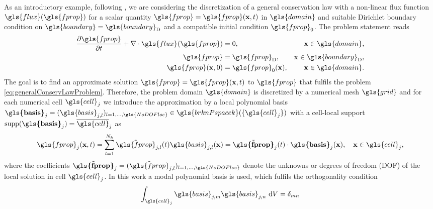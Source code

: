 As an introductory example, following \textcite{hesthaven_nodal_2008}, we are considering the discretization of a general conservation law with a non-linear flux function $\gls{flux}(\gls{fprop})$ for a scalar quantity $\gls{fprop} = \gls{fprop}(\vectr{x},t)$ in $\gls{domain}$ and suitable Dirichlet boundary condition on $\gls{boundary} = \diri{\gls{boundary}}$ and a compatible initial condition $\gls{fprop}_0$. The problem statement reads
\begin{subequations}
	\begin{align}
		\pDeriv{\gls{fprop}}{t} + \div{\gls{flux}(\gls{fprop})} & = 0,                        & \vectr{x} \in  \gls{domain},    \label{eq:generalConservLaw} \\
		\gls{fprop}                                             & = \diri{\gls{fprop}},       & \vectr{x} \in \diri{\gls{boundary}},
		\label{eq:generalConservLawBC}                                                                                                                       \\
		\gls{fprop}(\vectr{x}, 0)                               & = \gls{fprop}_0(\vectr{x}), & \vectr{x} \in  \gls{domain}.
		\label{eq:generalConservLawIC}
	\end{align}
	\label{eq:generalConservLawProblem}
\end{subequations}
The goal is to find an approximate solution $\gls{fprop} = \gls{fprop}(\vectr{x},t)$ to $\gls{fprop}$ that fulfils the problem \eqref{eq:generalConservLawProblem}. Therefore, the problem domain $\gls{domain}$ is discretized by a numerical mesh $\gls{grid}$ and for each numerical cell $\gls{cell}_j$ we introduce the approximation by a local polynomial basis $\vectr{\gls{basis}}_j = (\gls{basis}_{j,l})_{l=1,...,\gls{NoDOFloc}} \in \gls{brknPspacek}(\{\gls{cell}_j\})$ with a cell-local support $\textrm{supp}(\vectr{\gls{basis}}_j) = \overline{\gls{cell}}_j$ as
\begin{equation}
	\gls{fprop}_j(\vectr{x},t) = \sum_{l=1}^{N_k} \tilde{\gls{fprop}}_{j,l}(t) \gls{basis}_{j,l}(\vectr{x}) = \tilde{\vectr{\gls{fprop}}}_{j}(t) \cdot \vectr{\gls{basis}}_{j}(\vectr{x}), \quad \vectr{x} \in \gls{cell}_j,
	\label{eq:localApprox}
\end{equation}
where the coefficients $\tilde{\vectr{\gls{fprop}}}_{j} = (\tilde{\gls{fprop}}_{j,l})_{l=1,...,\gls{NoDOFloc}}$ denote the unknowns or degrees of freedom (DOF) of the local solution in cell $\gls{cell}_j$. In this work a modal polynomial basis is used, which fulfils the orthogonality condition
\begin{equation}
	\int_{\gls{cell}_j}  \gls{basis}_{j,m} \gls{basis}_{j,n} \d{V} = \delta_{mn}
\end{equation}
